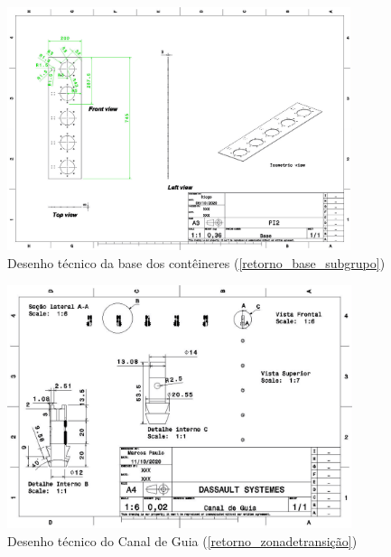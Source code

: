 \begin{apendicesenv}
\begin{figure}[H]
    \centering
    \includegraphics[width=0.9\textwidth]{figuras/estrutura/Desenhos/Drawing1_Base.jpg}
    \caption{Desenho técnico da base dos contêineres (\ref{retorno_base_subgrupo})}
    \label{fig:base_subgrupo}
\end{figure}

\begin{figure}[H]
    \centering
    \includegraphics[width=0.9\textwidth]{figuras/estrutura/Desenhos/Canal de Guia.jpg}
    \caption{Desenho técnico do Canal de Guia (\ref{retorno_zonadetransição})}
    \label{fig:canalguia}
\end{figure}


\end{apendicesenv}
